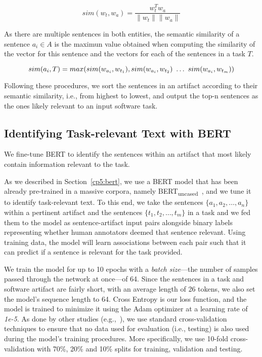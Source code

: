 \begin{equation}
    sim(w_t,w_a) = \frac{w_t^Tw_a}{\|w_t\| \|w_a\|}
    \label{eq:word-sim}
\end{equation}
 
\smallskip
 As there are multiple sentences in both entities, the semantic similarity of a sentence $a_i \in A$ is the maximun value obtained when computing the similarity of the vector for this sentence and the vectors for each of the sentences in a task $T$.

 \begin{equation}
    sim(a_i, T) = max(sim(w_{a_i}, w_{t_1}), sim(w_{a_i}, w_{t_2}) ~\dots~ sim(w_{a_i}, w_{t_m})) \\
\end{equation}


Following these procedures, we sort the sentences in an artifact according to their semantic similarity, i.e., from highest to lowest, and output the top-n sentences as the ones likely relevant to an input software task.


\subsection{Identifying Task-relevant Text with BERT}
\label{cp5:approach-bert}



We fine-tune BERT to identify the sentences within an artifact that most likely contain information relevant to the task.



As we described in Section~\ref{cp5:bert}, we use a BERT model that has been already pre-trained in a massive corpora, namely BERT\textsubscript{uncased}~\cite{Devlin2018Bert}, and we tune it to identify task-relevant text.
To this end, we take the sentences $\{a_1, a_2, \dots, a_n\}$ within a pertinent artifact and the sentences $\{t_1, t_2, \dots, t_m\}$ in a task and we fed them to the model as sentence-artifact input pairs 
alongside binary labels representing whether human annotators deemed that sentence relevant. 
Using training data, the model will learn associations between each pair such that it can predict if a sentence is relevant for the task provided. 


We train the model for up to 10 epochs with a \textit{batch size}---the number of samples passed through the network at once---of 64. Since the sentences in a task and software artifact are fairly short, with an average length of 26 tokens, we also set the model's sequence length to 64. Cross Entropy is our loss function, and the model is trained to minimize it using the Adam optimizer at a learning rate of \textit{1e-5}.
As done by other studies (e.g.,~\cite{Chaparro2017, fucci2019, Petrosyan2015}), we use standard cross-validation techniques to ensure  that no data used for evaluation (i.e., testing) is also used
during the model's training procedures. More specifically, we use 10-fold cross-validation with 70\%, 20\% and 10\% splits for training, validation and testing. 




